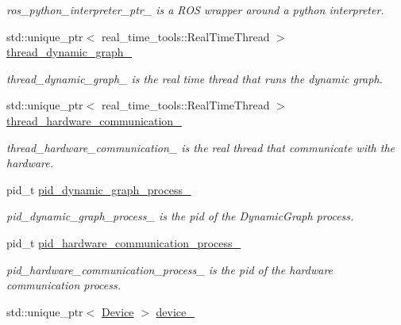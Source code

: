 \begin{DoxyCompactItemize}
\begin{DoxyCompactList}\small\item\em ros\+\_\+python\+\_\+interpreter\+\_\+ptr\+\_\+ is a R\+OS wrapper around a python interpreter. \end{DoxyCompactList}\item 
std\+::unique\+\_\+ptr$<$ real\+\_\+time\+\_\+tools\+::\+Real\+Time\+Thread $>$ \hyperlink{classdynamic__graph_1_1DynamicGraphManager_aee7d35de31cdb05958c1b4f539c290ae}{thread\+\_\+dynamic\+\_\+graph\+\_\+}\hypertarget{classdynamic__graph_1_1DynamicGraphManager_aee7d35de31cdb05958c1b4f539c290ae}{}\label{classdynamic__graph_1_1DynamicGraphManager_aee7d35de31cdb05958c1b4f539c290ae}

\begin{DoxyCompactList}\small\item\em thread\+\_\+dynamic\+\_\+graph\+\_\+ is the real time thread that runs the dynamic graph. \end{DoxyCompactList}\item 
std\+::unique\+\_\+ptr$<$ real\+\_\+time\+\_\+tools\+::\+Real\+Time\+Thread $>$ \hyperlink{classdynamic__graph_1_1DynamicGraphManager_ae0e1a3c59fa7d0282529e1a544e83b4d}{thread\+\_\+hardware\+\_\+communication\+\_\+}\hypertarget{classdynamic__graph_1_1DynamicGraphManager_ae0e1a3c59fa7d0282529e1a544e83b4d}{}\label{classdynamic__graph_1_1DynamicGraphManager_ae0e1a3c59fa7d0282529e1a544e83b4d}

\begin{DoxyCompactList}\small\item\em thread\+\_\+hardware\+\_\+communication\+\_\+ is the real thread that communicate with the hardware. \end{DoxyCompactList}\item 
pid\+\_\+t \hyperlink{classdynamic__graph_1_1DynamicGraphManager_aa8aa645099e7e9cce426381e38b5027d}{pid\+\_\+dynamic\+\_\+graph\+\_\+process\+\_\+}
\begin{DoxyCompactList}\small\item\em pid\+\_\+dynamic\+\_\+graph\+\_\+process\+\_\+ is the pid of the Dynamic\+Graph process. \end{DoxyCompactList}\item 
pid\+\_\+t \hyperlink{classdynamic__graph_1_1DynamicGraphManager_a02232cdc5cabca34d07dada6ced38532}{pid\+\_\+hardware\+\_\+communication\+\_\+process\+\_\+}
\begin{DoxyCompactList}\small\item\em pid\+\_\+hardware\+\_\+communication\+\_\+process\+\_\+ is the pid of the hardware communication process. \end{DoxyCompactList}\item 
std\+::unique\+\_\+ptr$<$ \hyperlink{classdynamic__graph_1_1Device}{Device} $>$ \hyperlink{classdynamic__graph_1_1DynamicGraphManager_a416ca1c33660df4f7f74eb29df4c5a58}{device\+\_\+}\hypertarget{classdynamic__graph_1_1DynamicGraphManager_a416ca1c33660df4f7f74eb29df4c5a58}{}\label{classdynamic__graph_1_1DynamicGraphManager_a416ca1c33660df4f7f74eb29df4c5a58}


\end{DoxyCompactItemize}
